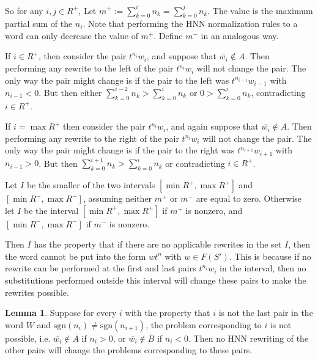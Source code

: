\documentclass[12pt]{article} %
\theoremstyle{definition}
\theoremstyle{definition}
\theoremstyle{definition}
\newtheorem{lemma}[thm]{Lemma}
\theoremstyle{definition}
\begin{document}
So for any $i, j \in R^{+}$, Let $m^{+} :=
\sum_{k=0}^i n_k = \sum_{k=0}^j n_k$. The value
is the maximum partial sum of the $n_i$. Note that performing the HNN
normalization rules to a word can only decrease the value of $m^{+}$.
Define $m^{-}$ in an analogous way.

If $i \in R^{+}$, then consider the pair $t^{n_i}w_i$, and suppose that
$\overline{w_i} \notin A$. Then performing any rewrite to the left of the
pair $t^{n_i}w_i$ will not change the pair. The only way the pair might change
is if the pair to the left was $t^{n_{i-1}}w_{i-1}$ with $n_{i-1} < 0$.
But then either $\sum_{k=0}^{i-2} n_k > \sum_{k=0}^i n_k$ or $0 > \sum_{k=0}^i n_k$,
contradicting $i \in R^{+}$.

If $i = \max R^{+}$ then consider the pair $t^{n_i}w_i$, and again suppose that
$\overline{w_i} \notin A$. Then performing any rewrite to the right of the
pair $t^{n_i}w_i$ will not change the pair. The only way the pair might change
is if the pair to the right was $t^{n_{i+1}}w_{i+1}$ with $n_{i-1} > 0$.
But then $\sum_{k=0}^{i+1} n_k > \sum_{k=0}^i n_k$ or contradicting $i \in R^{+}$.

Let $I$ be the smaller of the two intervals $[\min R^+, \max R^+]$ and
$[\min R^{-}, \max R^-]$, assuming neither $m^+$ or $m^-$ are equal to zero.
Otherwise let $I$ be the interval $[\min R^+, \max R^+]$ if $m^+$ is nonzero,
and $[\min R^-, \max R^-]$ if $m^-$ is nonzero.

Then $I$ has the property that if there are no applicable rewrites
in the set $I$, then the word cannot be put into the form $wt^n$ with $w \in F(S')$.
This is because if no rewrite can be performed
at the first and last pairs $t^{n_i}w_i$
in the interval, then no substitutions performed outside this interval will
change these pairs to make the rewrites possible.

\begin{lemma}\label{signseq}
Suppose for every $i$ with the property that $i$ is not
the last pair in the word $W$ and $\text{sgn}(n_i) \ne \text{sgn}(n_{i+1})$,
the problem corresponding to $i$ is not possible, i.e. $\overline{w_i} \notin \overline{A}$
if $n_i > 0$, or $\overline{w_i}
\notin \overline{B}$ if $n_i < 0$. Then no HNN rewriting of the other pairs will
change the problems corresponding to these pairs.
\end{lemma}
\end{document}
